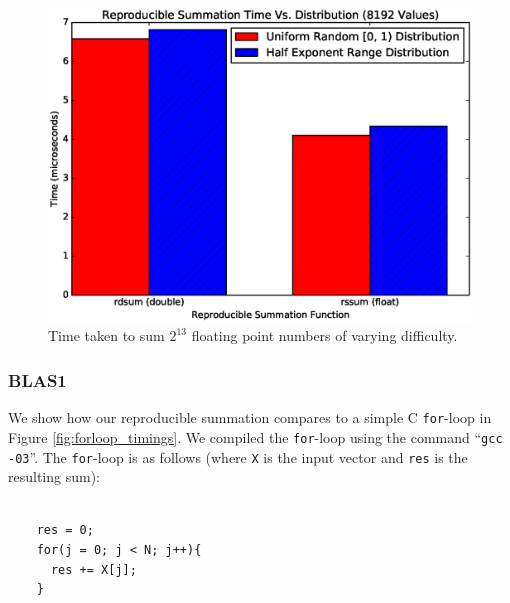   \begin{figure}[H]
  \begin{center}
  \includegraphics[width=\textwidth]{plots/easy_vs_hard}
  \caption{Time taken to sum $2^{13}$ floating point numbers of varying difficulty.}
  \label{fig:easy_vs_hard_timings}
  \end{center}
  \end{figure}
  \subsubsection{BLAS1}

    We show how our reproducible summation compares to a simple C \texttt{for}-loop in Figure \ref{fig:forloop_timings}. We compiled the \texttt{for}-loop using the command ``\texttt{gcc -03}''. The \texttt{for}-loop is as follows (where \texttt{X} is the input vector and \texttt{res} is the resulting sum):
    \begin{lstlisting}

    res = 0;
    for(j = 0; j < N; j++){
      res += X[j];
    }
    \end{lstlisting}

